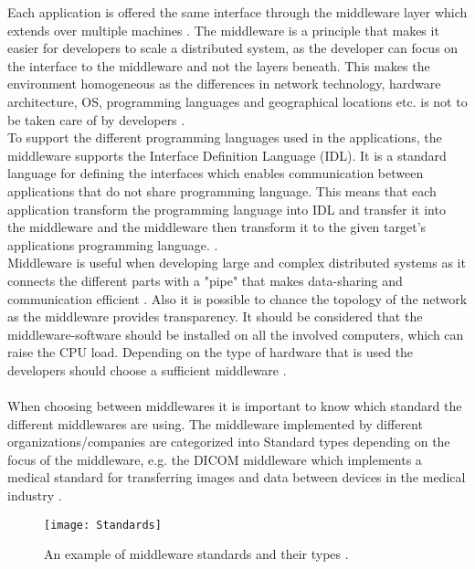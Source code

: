 \documentclass[Main]{subfiles}
\begin{document}
Each application is offered the same interface through the middleware layer which extends over multiple machines \cite[p. 3]{Tanenbaum}. 
The middleware is a principle that makes it easier for developers to scale a distributed system, as the developer can focus on the interface to the middleware and not the layers beneath. 
This makes the environment homogeneous as the differences in network technology, hardware architecture, OS, programming languages and geographical locations etc. is not to be taken care of by developers \cite{DDS-slides} \cite[p. 68]{Coulouris}.
\\
To support the different programming languages used in the applications, the middleware supports the Interface Definition Language (IDL). 
It is a standard language for defining the interfaces which enables communication between applications that do not share programming language. 
This means that each application transform the programming language into IDL and transfer it into the middleware and the middleware then transform it to the given target's applications programming language. \cite{DDS-slides} \cite{RTI} \cite{wiki-idl}.
\\
Middleware is useful when developing large and complex distributed systems as it connects the different parts with a "pipe" that makes data-sharing and communication efficient \cite{DDS-slides} \cite[p. 68]{Coulouris}. 
Also it is possible to chance the topology of the network as the middleware provides transparency. 
It should be considered that the middleware-software should be installed on all the involved computers, which can raise the CPU load.
Depending on the type of hardware that is used the developers should choose a sufficient middleware \cite{DDS-slides}.
\\
\\
When choosing between middlewares it is important to know which standard the different middlewares are using. The middleware implemented by different organizations/companies are categorized into Standard types depending on the focus of the middleware, e.g. the DICOM middleware which implements a medical standard for transferring images and data between devices in the medical industry \cite{DDS-slides}.


\begin{figure}[htbp]
\centering
\texttt{[image: Standards]}
\caption{An example of middleware standards and their types \cite{DDS-slides}.}
\label{fig:standards}
\end{figure}
\end{document}
